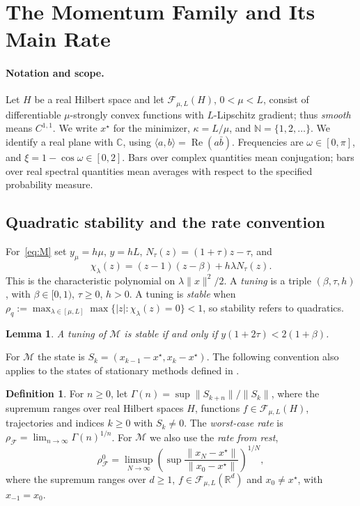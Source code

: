 \documentclass[11pt]{article}
\newtheorem{lemma}[theorem]{Lemma}
\theoremstyle{definition}
\newtheorem{definition}[theorem]{Definition}
\theoremstyle{remark}
\newcommand{\R}{\mathbb R}
\newcommand{\C}{\mathbb C}
\newcommand{\N}{\mathbb N}
\newcommand{\cF}{\mathcal F}
\newcommand{\cM}{\mathcal M}
\newcommand{\Rea}{\operatorname{Re}}
\newcommand{\ip}[2]{\langle #1,#2\rangle}
\newcommand{\norm}[1]{\lVert #1\rVert}
\newcommand{\rhoF}{\rho_{\cF}}
\newcommand{\rhoz}{\rho_{\cF}^{0}}
\begin{document}
\section{The Momentum Family and Its Main Rate}
\label{sec:prelim}

\paragraph{Notation and scope.}
Let \(H\) be a real Hilbert space and let \(\cF_{\mu,L}(H)\), \(0<\mu<L\),
consist of differentiable \(\mu\)-strongly convex functions with
\(L\)-Lipschitz gradient; thus \emph{smooth} means \(C^{1,1}\).  We write \(x^\star\) for the minimizer,
\(\kappa=L/\mu\), and \(\N=\{1,2,\ldots\}\).
We identify a real plane with \(\C\), using \(\ip ab=\Rea(a\bar b)\).
Frequencies are \(\omega\in[0,\pi]\), and \(\xi=1-\cos\omega\in[0,2]\).
Bars over complex quantities mean conjugation; bars over real spectral
quantities mean averages with respect to the specified probability measure.

\subsection{Quadratic stability and the rate convention}

For~\eqref{eq:M} set \(y_\mu=h\mu\), \(y=hL\),
\(N_\tau(z)=(1+\tau)z-\tau\), and
\[
\chi_\lambda(z)=(z-1)(z-\beta)+h\lambda N_\tau(z).
\]
This is the characteristic polynomial on \(\lambda\norm x^2/2\).
A \emph{tuning} is a triple \((\beta,\tau,h)\), with
\(\beta\in[0,1)\), \(\tau\ge0\), \(h>0\).
A tuning is \emph{stable} when
\(\rho_q:=\max_{\lambda\in[\mu,L]}\max\{|z|:\chi_\lambda(z)=0\}<1\),
so stability refers to quadratics.

\begin{lemma}\label{lem:qstab}
A tuning of \(\cM\) is stable if and only if \(y(1+2\tau)<2(1+\beta)\).
\end{lemma}

For \(\cM\) the state is \(S_k=(x_{k-1}-x^\star,x_k-x^\star)\).
The following convention also applies to the states of stationary methods
defined in .
\begin{definition}\label{def:rate}
For \(n\ge0\), let \(\Gamma(n)=\sup\norm{S_{k+n}}/\norm{S_k}\), where the
supremum ranges over real Hilbert spaces \(H\), functions \(f\in\cF_{\mu,L}(H)\),
trajectories and indices \(k\ge0\) with \(S_k\ne0\).  The \emph{worst-case rate} is
\(\rhoF=\lim_{n\to\infty}\Gamma(n)^{1/n}\).  For \(\cM\) we also use the
\emph{rate from rest},
\[
\rhoz=\limsup_{N\to\infty}
\left(\sup\frac{\norm{x_N-x^\star}}{\norm{x_0-x^\star}}\right)^{1/N},
\]
where the supremum ranges over \(d\ge1\), \(f\in\cF_{\mu,L}(\R^d)\) and
\(x_0\ne x^\star\), with \(x_{-1}=x_0\).
\end{definition}
\end{document}
